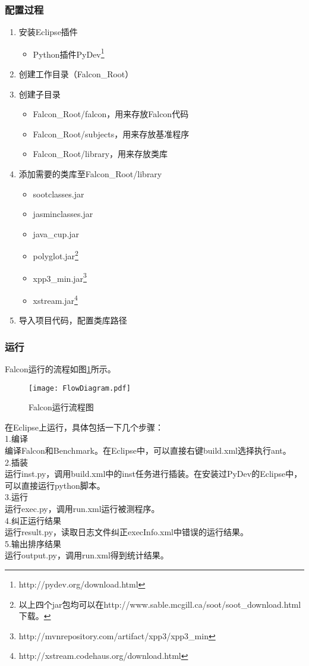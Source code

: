 \subsubsection{配置过程}
\begin{enumerate}
  \item 安装Eclipse插件
  \begin{itemize}
    \item Python插件PyDev\footnote{http://pydev.org/download.html}
  \end{itemize}
  \item 创建工作目录（Falcon\_Root）
  \item 创建子目录
  \begin{itemize}
    \item Falcon\_Root/falcon，用来存放Falcon代码
    \item Falcon\_Root/subjects，用来存放基准程序
    \item Falcon\_Root/library，用来存放类库
  \end{itemize}
  \item 添加需要的类库至Falcon\_Root/library
  \begin{itemize}
    \item sootclasses.jar
    \item jasminclasses.jar
    \item java\_cup.jar
    \item polyglot.jar\footnote{以上四个jar包均可以在http://www.sable.mcgill.ca/soot/soot\_download.html下载。}
    \item xpp3\_min.jar\footnote{http://mvnrepository.com/artifact/xpp3/xpp3\_min}
    \item xstream.jar\footnote{http://xstream.codehaus.org/download.html}
  \end{itemize}
  \item 导入项目代码，配置类库路径
\end{enumerate}
\subsubsection{运行}
Falcon运行的流程如图\ref{pic:FlowDiagram}所示。
\begin{figure}[!ht]
  \centering
  \texttt{[image: FlowDiagram.pdf]}\\
  \caption{Falcon运行流程图}\label{pic:FlowDiagram}
\end{figure}\par
在Eclipse上运行，具体包括一下几个步骤：\\
1.编译\\
编译Falcon和Benchmark。在Eclipse中，可以直接右键build.xml选择执行ant。\\
2.插装\\
运行inst.py，调用build.xml中的inst任务进行插装。在安装过PyDev的Eclipse中，可以直接运行python脚本。\\
3.运行\\
运行exec.py，调用run.xml运行被测程序。\\
4.纠正运行结果\\
运行result.py，读取日志文件纠正execInfo.xml中错误的运行结果。\\
5.输出排序结果\\
运行output.py，调用run.xml得到统计结果。
